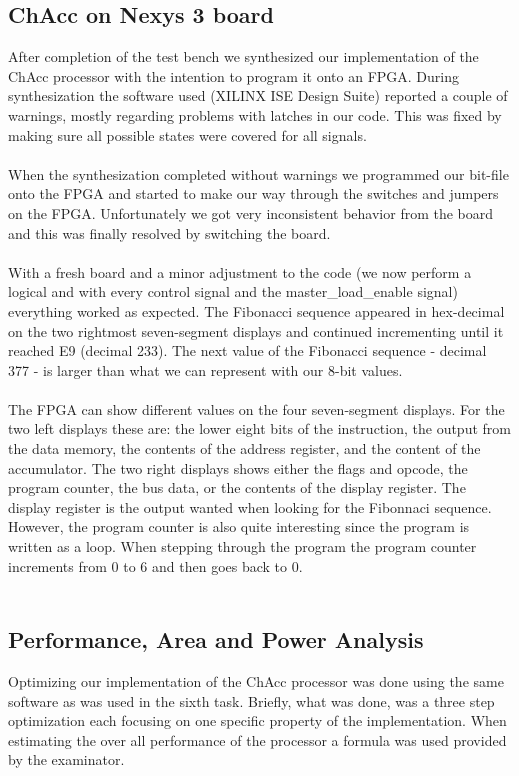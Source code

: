 \documentclass[a4paper,11pt]{article}
\begin{document}
\subsection{ChAcc on Nexys 3 board}
After completion of the test bench we synthesized our implementation of the 
ChAcc processor with the intention to program it onto an FPGA. During 
synthesization the software used (XILINX ISE Design Suite) reported a couple 
of warnings, mostly regarding problems with latches in our code. This was 
fixed by making sure all possible states were covered for all signals.\\\\
\noindent
When the synthesization  completed without warnings we programmed our bit-file 
onto the FPGA and started to make our way through the switches and jumpers on 
the FPGA. Unfortunately we got very inconsistent behavior from the board and 
this was finally resolved by switching the board.\\\\
\noindent
With a fresh board and a minor adjustment to the code (we now perform a 
logical and with every control signal and the master\_load\_enable signal) 
everything worked as expected. The Fibonacci sequence appeared in hex-decimal 
on the two rightmost seven-segment displays and continued incrementing until 
it reached E9 (decimal 233). The next value of the Fibonacci sequence - 
decimal 377 - is larger than what we can represent with our 8-bit values.\\\\
\noindent
The FPGA can show different values on the four seven-segment displays. For 
the two left displays these are: the lower eight bits of the instruction, 
the output from the data memory, the contents of the address register, and 
the content of the accumulator. The two right displays shows either the 
flags and opcode, the program counter, the bus data, or the contents of the 
display register. The display register is the output wanted when looking for 
the Fibonnaci sequence. However, the program counter is also quite interesting 
since the program is written as a loop. When stepping through the program 
the program counter increments from 0 to 6 and then goes back to 0.\\\\
\noindent

\subsection{Performance, Area and Power Analysis}
Optimizing our implementation of the ChAcc processor was done using the 
same software as was used in the sixth task. Briefly, what was done, was a 
three step optimization each focusing on one specific property of the 
implementation. When estimating the over all performance of the processor 
a formula was used provided by the examinator.
\end{document}
